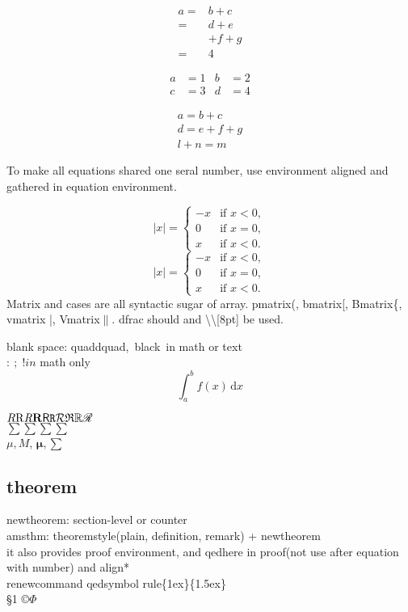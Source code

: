 \documentclass{article}
\begin{document}
    \begin{align}
    a ={} & b+c\\
     ={} & d+e\\
     & + f + g\\
     ={} & 4
    \end{align}

    \begin{align}
    a &= 1 & b&= 2\\
    c &= 3 & d&= 4
    \end{align}

    \begin{gather}
    a = b + c\\
    d = e + f + g\\
    l + n = m
    \end{gather}

    To make all equations shared one seral number, use environment aligned and gathered in equation environment.

    \[ |x| = \left\{\begin{array}{rl}
    -x & \text{if }x<0,\\
    0 & \text{if }x=0,\\
    x & \text{if }x<0.
    \end{array} \right. \]
    \[ |x| = \begin{cases}
    -x & \text{if }x<0,\\
    0 & \text{if }x=0,\\
    x & \text{if }x<0.
    \end{cases} \]
    Matrix and cases are all syntactic sugar of array. pmatrix(, bmatrix[, Bmatrix\{, vmatrix |, Vmatrix$\|$. dfrac should and \textbackslash\textbackslash[8pt] be used.

    blank space: quadd\qquad quad\quad ,\, black\ in math or text\\
    $:\:;\;!\!in$ math only
    \[
        \int_a^b f(x)\,\mathrm{d}x
    \]

    $\mathnormal{R}\mathrm{R}\mathit{R}\mathbf{R}\mathsf{R}\mathtt{R}\mathcal{R}\mathfrak{R}\mathbb{R}
    \mathscr{R}$\\
    ${\displaystyle \sum}{\textstyle \sum}{\scriptstyle \sum}{\scriptscriptstyle \sum}$\\
    {\boldmath$\mu,M$}, $\boldsymbol{\mu}, \bm{\sum} $
    
\subsection{theorem}
    newtheorem: section-level or counter\\
    amsthm: theoremstyle(plain, definition, remark) + newtheorem\\
    it also provides proof environment, and qedhere in proof(not use after equation with number) and align*\\
    renewcommand qedsymbol rule\{1ex\}\{1.5ex\}\\
    \S 1 \copyright $\varPhi$ \\
\end{document}
